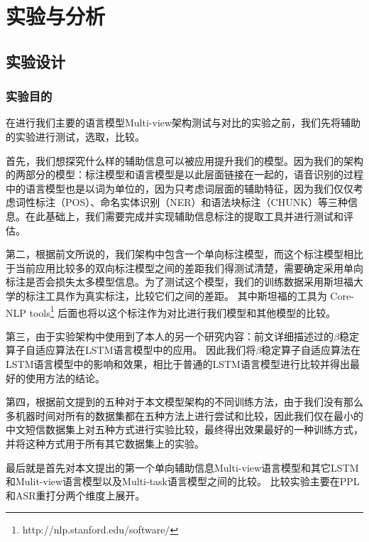 
\chapter{实验与分析}
\label{chap:experiment}




\section{实验设计}


\subsection{实验目的}
在进行我们主要的语言模型Multi-view架构测试与对比的实验之前，我们先将辅助的实验进行测试，选取，比较。

首先，我们想探究什么样的辅助信息可以被应用提升我们的模型。因为我们的架构的两部分的模型：标注模型和语言模型是以此层面链接在一起的，语音识别的过程中的语言模型也是以词为单位的，因为只考虑词层面的辅助特征，因为我们仅仅考虑词性标注（POS）、命名实体识别（NER）和语法块标注（CHUNK）等三种信息。在此基础上，我们需要完成并实现辅助信息标注的提取工具并进行测试和评估。

第二，根据前文所说的，我们架构中包含一个单向标注模型，而这个标注模型相比于当前应用比较多的双向标注模型之间的差距我们得测试清楚，需要确定采用单向标注是否会损失太多模型信息。为了测试这个模型，我们的训练数据采用斯坦福大学的标注工具作为真实标注，比较它们之间的差距。
其中斯坦福的工具为
Core-NLP tools\footnote{http://nlp.stanford.edu/software/}
后面也将以这个标注作为对比进行我们模型和其他模型的比较。

第三，由于实验架构中使用到了本人的另一个研究内容：前文详细描述过的$\beta$稳定算子自适应算法在LSTM语言模型中的应用。
因此我们将$\beta$稳定算子自适应算法在LSTM语言模型中的影响和效果，相比于普通的LSTM语言模型进行比较并得出最好的使用方法的结论。

第四，根据前文提到的五种对于本文模型架构的不同训练方法，由于我们没有那么多机器时间对所有的数据集都在五种方法上进行尝试和比较，因此我们仅在最小的中文短信数据集上对五种方式进行实验比较，最终得出效果最好的一种训练方式，并将这种方式用于所有其它数据集上的实验。

最后就是首先对本文提出的第一个单向辅助信息Multi-view语言模型和其它LSTM和Mulit-view语言模型以及Multi-task语言模型之间的比较。
比较实验主要在PPL和ASR重打分两个维度上展开。

